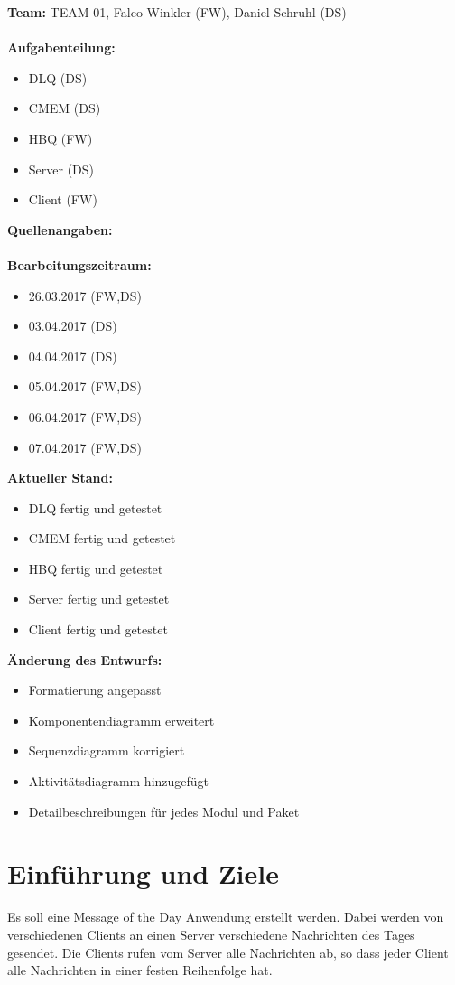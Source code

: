 \documentclass{article}
\begin{document}
\textbf{Team:} TEAM 01, Falco Winkler (FW), Daniel Schruhl (DS)\\
\\
\textbf{Aufgabenteilung:}
\begin{itemize}
    \item DLQ (DS)
    \item CMEM (DS)
	\item HBQ (FW)
	\item Server (DS)
	\item Client (FW)
\end{itemize}

\textbf{Quellenangaben:}\\
\\
\textbf{Bearbeitungszeitraum:}
\begin{itemize}
	\item 26.03.2017 (FW,DS)
	\item 03.04.2017 (DS)
	\item 04.04.2017 (DS)
	\item 05.04.2017 (FW,DS)
	\item 06.04.2017 (FW,DS)
	\item 07.04.2017 (FW,DS)
\end{itemize}

\textbf{Aktueller Stand:}
\begin{itemize}
	\item DLQ fertig und getestet
	\item CMEM fertig und getestet
	\item HBQ fertig und getestet
	\item Server fertig und getestet
	\item Client fertig und getestet
\end{itemize}

\textbf{Änderung des Entwurfs:}
\begin{itemize}
    \item Formatierung angepasst
	\item Komponentendiagramm erweitert
	\item Sequenzdiagramm korrigiert
	\item Aktivitätsdiagramm hinzugefügt
	\item Detailbeschreibungen für jedes Modul und Paket
\end{itemize}

\newpage

\section{Einführung und Ziele}
Es soll eine Message of the Day Anwendung erstellt werden. Dabei werden von verschiedenen Clients an einen Server verschiedene Nachrichten des Tages gesendet. Die Clients rufen vom Server alle Nachrichten ab, so dass jeder Client alle Nachrichten in einer festen Reihenfolge hat.
\end{document}
